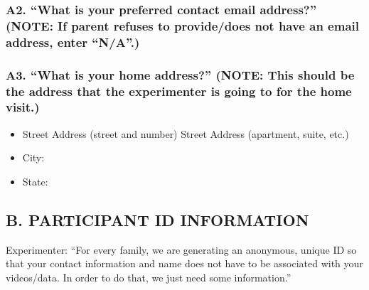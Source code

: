 \documentclass[
  12pt,
]{book}
\begin{document}
\hypertarget{a2.-what-is-your-preferred-contact-email-address-note-if-parent-refuses-to-providedoes-not-have-an-email-address-enter-na.}{%
\subsubsection*{A2. ``What is your preferred contact email address?'' (NOTE: If parent refuses to provide/does not have an email address, enter ``N/A''.)}\label{a2.-what-is-your-preferred-contact-email-address-note-if-parent-refuses-to-providedoes-not-have-an-email-address-enter-na.}}

\hypertarget{a3.-what-is-your-home-address-note-this-should-be-the-address-that-the-experimenter-is-going-to-for-the-home-visit.}{%
\subsubsection*{A3. ``What is your home address?'' (NOTE: This should be the address that the experimenter is going to for the home visit.)}\label{a3.-what-is-your-home-address-note-this-should-be-the-address-that-the-experimenter-is-going-to-for-the-home-visit.}}

\begin{itemize}
\item
  Street Address (street and number) Street Address (apartment, suite, etc.)
\item
  City:
\item
  State:
\end{itemize}

\hypertarget{b.-participant-id-information}{%
\subsection*{B. PARTICIPANT ID INFORMATION}\label{b.-participant-id-information}}

Experimenter: ``For every family, we are generating an anonymous, unique ID so that your contact information and name does not have to be associated with your videos/data. In order to do that, we just need some information.''
\end{document}
